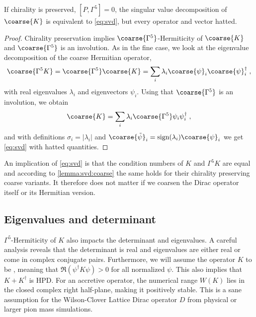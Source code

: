 \begin{lemma} \label{lemma:svd:coarse}
If chirality is preserved, $[P, \Gamma^5]=0$, the singular value decomposition of $\coarse{K}$ is equivalent to \cref{eq:svd}, but every operator and vector hatted.
\end{lemma}

\begin{proof}
Chirality preservation implies $\coarse{\Gamma^{5}}$-Hermiticity of $\coarse{K}$ and $\coarse{\Gamma^{5}}$ is an involution.
As in the fine case, we look at the eigenvalue decomposition of the coarse Hermitian operator,
\begin{equation}
\coarse{\Gamma^{5} K} = \coarse{\Gamma^{5}} \coarse{K} = \sum_{i} \lambda_i \coarse{\psi}_i \coarse{\psi}_i^{\dagger} \;,
\end{equation}
with real eigenvalues $\lambda_i$ and eigenvectors $\psi_i$. Using that $\coarse{\Gamma^{5}}$ is an involution, we obtain
\begin{equation}
\coarse{K} = \sum_{i} \lambda_i \coarse{\Gamma^{5}} \psi_i \psi_i^{\dagger} \;,
\end{equation}
and with definitions $\sigma_i = \lvert \lambda_i \rvert$ and $\coarse{\tilde{\psi}}_i = \text{sign}(\lambda_i) \coarse{\psi}_i$ we get \cref{eq:svd} with hatted quantities.
\end{proof}

An implication of \cref{eq:svd} is that the condition numbers of $K$ and $\Gamma^{5} K$ are equal and according to \cref{lemma:svd:coarse} the same holds for their chirality preserving coarse variants.
It therefore does not matter if we coarsen the Dirac operator itself or its Hermitian version.

\subsection{Eigenvalues and determinant}

$\Gamma^{5}$-Hermiticity of $K$ also impacts the determinant and eigenvalues.
A careful analysis reveals that the determinant is real and eigenvalues are either real or come in complex conjugate pairs.
Furthermore, we will assume the operator $K$ to be , meaning that $\Re(\psi^{\dagger} K \psi) > 0$ for all normalized $\psi$.
This also implies that $K + K^{\dagger}$ is HPD.
For an accretive operator, the numerical range $W(K)$ lies in the closed complex right half-plane, making it positively stable.
This is a sane assumption for the Wilson-Clover Lattice Dirac operator $D$ from physical or larger pion mass simulations.

